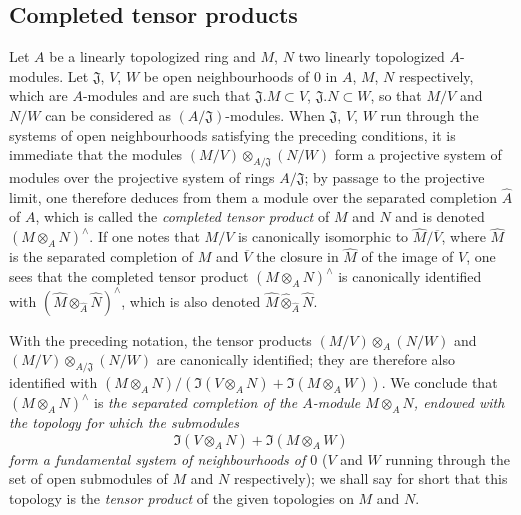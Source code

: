 \subsection{Completed tensor products}
\label{subsection:0.7.7}

\begin{env}[7.7.1]
\label{0.7.7.1}
Let $A$ be a linearly topologized ring and $M$, $N$ two linearly
topologized $A$-modules. Let $\mathfrak J$, $V$, $W$ be open neighbourhoods
of $0$ in $A$, $M$, $N$ respectively, which are
$A$-modules and are such that $\mathfrak J.M\subset V$, $\mathfrak J.N\subset W$,
so that $M/V$ and $N/W$ can be considered as
$(A/\mathfrak J)$-modules. When $\mathfrak J$, $V$, $W$ run through the
systems of open neighbourhoods satisfying the preceding conditions, it is
immediate that the modules
$(M/V)\otimes_{A/\mathfrak J}(N/W)$ form a projective system of modules
over the projective system of rings $A/\mathfrak J$; by passage to the projective
limit, one therefore deduces from them a module over the separated completion $\widehat A$
of $A$, which is called the \emph{completed tensor product} of $M$ and
$N$ and is denoted $(M\otimes_A N)^\wedge$. If one notes that $M/V$
is canonically isomorphic to $\widehat M/\overline V$, where $\widehat M$ is
the separated completion of $M$ and $\overline V$ the closure in $\widehat M$ of
the image of $V$, one sees that the completed tensor product
$(M\otimes_A N)^\wedge$ is canonically identified with
$(\widehat M\otimes_{\widehat A}\widehat N)^\wedge$, which is also denoted
$\widehat M\widehat\otimes_{\widehat A}\widehat N$.
\end{env}

\begin{env}[7.7.2]
\label{0.7.7.2}
\begin{sloppypar}
With the preceding notation, the tensor products
$(M/V)\otimes_A(N/W)$ and
$(M/V)\otimes_{A/\mathfrak J}(N/W)$ are canonically identified; they
are therefore also identified with
$(M\otimes_A N)/(\Im(V\otimes_A N)+\Im(M\otimes_A W))$.
We conclude that $(M\otimes_A N)^\wedge$ is \emph{the separated completion of the
$A$-module $M\otimes_A N$, endowed with the topology for which the
submodules}
\[
  \Im(V\otimes_A N)+\Im(M\otimes_A W)
\]
\emph{form a fundamental system of neighbourhoods of $0$} ($V$ and $W$
running through the set of open submodules of $M$ and $N$
respectively); we shall say for short that this topology is the
\emph{tensor product} of the given topologies on $M$ and $N$.
\end{sloppypar}
\end{env}

